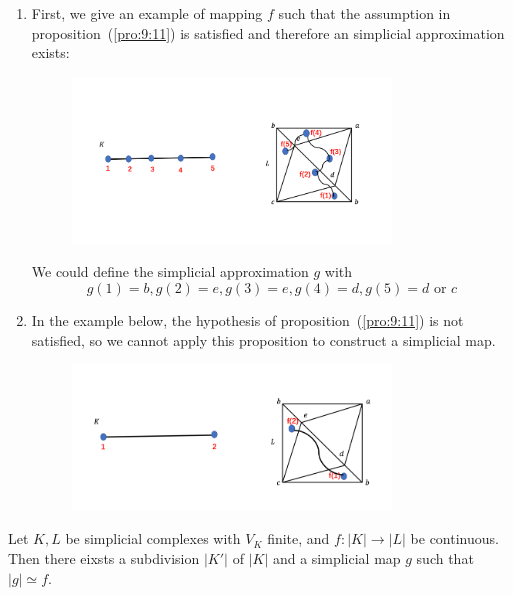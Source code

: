 \begin{example}
\begin{enumerate}
\item
First, we give an example of mapping $f$ such that the assumption in proposition~(\ref{pro:9:11}) is satisfied and therefore an simplicial approximation exists:
\begin{figure}[H]
\centering
\includegraphics[width=0.8\textwidth]{week9/f_15}
\end{figure}
We could define the simplicial approximation $g$ with
\[
g(1)=b,g(2)=e,g(3)=e,g(4)=d,g(5)=d\text{ or }c
\]
\item
In the example below, the hypothesis of proposition~(\ref{pro:9:11}) is not satisfied, so we cannot apply this proposition to construct a simplicial map.
\begin{figure}[H]
\centering
\includegraphics[width=0.8\textwidth]{week9/f_16}
\end{figure}
\end{enumerate}

\end{example}
\begin{theorem}
Let $K,L$ be simplicial complexes with $V_K$ finite, and $f:|K|\to|L|$ be continuous.
Then there eixsts a subdivision $|K'|$ of $|K|$ and a simplicial map $g$ such that $|g|\simeq f$.
\end{theorem}

























